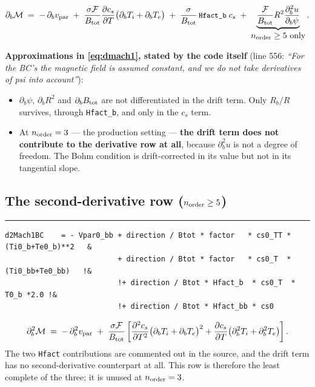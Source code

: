 \documentclass[11pt,a4paper]{article}
\newenvironment{codeline}[1]
  {\par\medskip\noindent\textcolor{coderule}{\rule{\linewidth}{0.4pt}}\par
   \nopagebreak\noindent{\ttfamily\footnotesize\textcolor{keyc}{#1}}\par\nopagebreak\smallskip}
  {\par\medskip}
\newcommand{\code}[1]{\texttt{\small #1}}
\begin{document}
\begin{equation}
  \partial_b\mathcal{M} \;=\; -\,\partial_b v_{\rm par}
  \;+\; \frac{\sigma\mathcal{F}}{B_{\rm tot}}\frac{\partial c_s}{\partial T}\bigl(\partial_b T_i + \partial_b T_e\bigr)
  \;+\; \frac{\sigma}{B_{\rm tot}}\,\code{Hfact\_b}\;c_s
  \;+\; \underbrace{\frac{\mathcal{F}}{B_{\rm tot}}R^2\frac{\partial_b^2 u}{\partial_b\psi}}
        _{\textstyle n_{\rm order}\ge 5\ \text{only}} .
  \label{eq:dmach1}
\end{equation}

\begin{keybox}
\textbf{Approximations in \eqref{eq:dmach1}, stated by the code itself} (line 556: \emph{``For
the BC's the magnetic field is assumed constant, and we do not take derivatives of psi into
account''}):
\begin{itemize}\itemsep2pt
  \item $\partial_b\psi$, $\partial_b R^2$ and $\partial_b B_{\rm tot}$ are not differentiated
        in the drift term.  Only $R_b/R$ survives, through \code{Hfact\_b}, and only in the
        $c_s$ term.
  \item At $n_{\rm order} = 3$ --- the production setting --- \textbf{the drift term does not
        contribute to the derivative row at all}, because $\partial_b^2 u$ is not a degree of
        freedom.  The Bohm condition is drift-corrected in its value but not in its
        tangential slope.
\end{itemize}
\end{keybox}

\subsection{The second-derivative row ($n_{\rm order}\ge5$)}

\begin{codeline}{mod\_boundary\_conditions.f90:657--668}
\begin{lstlisting}
d2Mach1BC    = - Vpar0_bb + direction / Btot * factor   * cs0_TT * (Ti0_b+Te0_b)**2   &
                          + direction / Btot * factor   * cs0_T  * (Ti0_bb+Te0_bb)   !&
                          !+ direction / Btot * Hfact_b  * cs0_T  * T0_b *2.0 !&
                          !+ direction / Btot * Hfact_bb * cs0
\end{lstlisting}
\end{codeline}

\begin{equation}
  \partial_b^2\mathcal{M} \;=\; -\,\partial_b^2 v_{\rm par}
  \;+\; \frac{\sigma\mathcal{F}}{B_{\rm tot}}\left[
        \frac{\partial^2 c_s}{\partial T^2}\bigl(\partial_b T_i + \partial_b T_e\bigr)^2
      + \frac{\partial c_s}{\partial T}\bigl(\partial_b^2 T_i + \partial_b^2 T_e\bigr)
        \right].
\end{equation}
The two \code{Hfact} contributions are commented out in the source, and the drift term has no
second-derivative counterpart at all.  This row is therefore the least complete of the three;
it is unused at $n_{\rm order}=3$.
\end{document}
